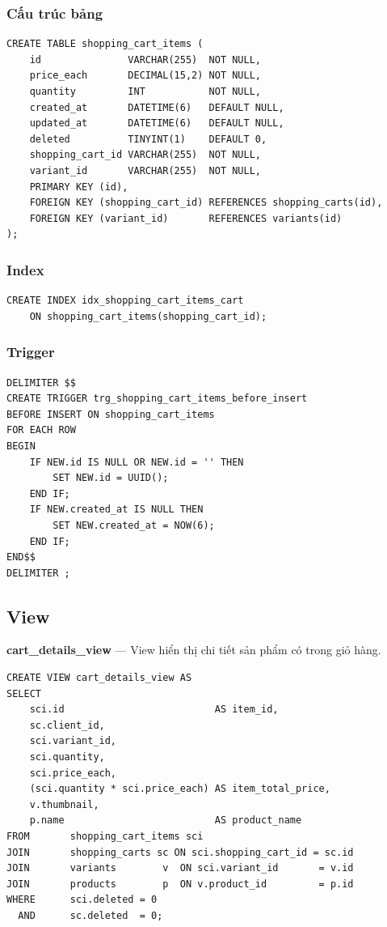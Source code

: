 \subsubsection{Cấu trúc bảng}

\begin{verbatim}
CREATE TABLE shopping_cart_items (
    id               VARCHAR(255)  NOT NULL,
    price_each       DECIMAL(15,2) NOT NULL,
    quantity         INT           NOT NULL,
    created_at       DATETIME(6)   DEFAULT NULL,
    updated_at       DATETIME(6)   DEFAULT NULL,
    deleted          TINYINT(1)    DEFAULT 0,
    shopping_cart_id VARCHAR(255)  NOT NULL,
    variant_id       VARCHAR(255)  NOT NULL,
    PRIMARY KEY (id),
    FOREIGN KEY (shopping_cart_id) REFERENCES shopping_carts(id),
    FOREIGN KEY (variant_id)       REFERENCES variants(id)
);
\end{verbatim}

\subsubsection{Index}

\begin{verbatim}
CREATE INDEX idx_shopping_cart_items_cart
    ON shopping_cart_items(shopping_cart_id);
\end{verbatim}

\subsubsection{Trigger}

\begin{verbatim}
DELIMITER $$
CREATE TRIGGER trg_shopping_cart_items_before_insert
BEFORE INSERT ON shopping_cart_items
FOR EACH ROW
BEGIN
    IF NEW.id IS NULL OR NEW.id = '' THEN
        SET NEW.id = UUID();
    END IF;
    IF NEW.created_at IS NULL THEN
        SET NEW.created_at = NOW(6);
    END IF;
END$$
DELIMITER ;
\end{verbatim}

\subsection{View}

\noindent\textbf{cart\_details\_view} --- View hiển thị chi tiết sản phẩm có trong giỏ hàng.

\begin{verbatim}
CREATE VIEW cart_details_view AS
SELECT
    sci.id                          AS item_id,
    sc.client_id,
    sci.variant_id,
    sci.quantity,
    sci.price_each,
    (sci.quantity * sci.price_each) AS item_total_price,
    v.thumbnail,
    p.name                          AS product_name
FROM       shopping_cart_items sci
JOIN       shopping_carts sc ON sci.shopping_cart_id = sc.id
JOIN       variants        v  ON sci.variant_id       = v.id
JOIN       products        p  ON v.product_id         = p.id
WHERE      sci.deleted = 0
  AND      sc.deleted  = 0;
\end{verbatim}
